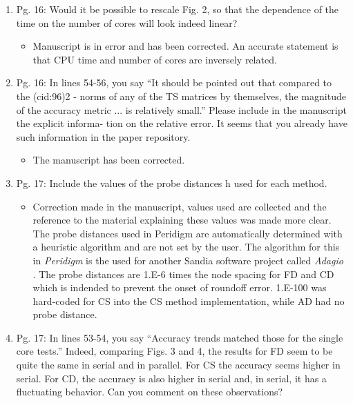 \documentclass{article}
\begin{document}
\begin{enumerate}
  \item
    Pg. 16: Would it be possible to rescale Fig. 2, so that the dependence of the time
    on the number of cores will look indeed linear?

{\color{red}  
\begin{itemize}
     \item
     Manuscript is in error and has been corrected. An accurate statement is that CPU time and number of cores are inversely related.
  \end{itemize}}

  \item
    Pg. 16: In lines 54-56, you say “It should be pointed out that compared to the (cid:96)2 -
    norms of any of the TS matrices by themselves, the magnitude of the accuracy
    metric ... is relatively small.” Please include in the manuscript the explicit informa-
    tion on the relative error. It seems that you already have such information in the
    paper repository.

{\color{red}  
\begin{itemize}
     \item
    The manuscript has been corrected. 
    \end{itemize}}

  \item
    Pg. 17: Include the values of the probe distances h used for each method.

{\color{red}  
\begin{itemize}
     \item
    Correction made in the manuscript, values used are collected and the reference to the material explaining these values was made more clear.
    The probe distances used in Peridigm are automatically determined with a
    heuristic algorithm and are not set by the user. The algorithm for this in
    \emph{Peridigm} is the used for another Sandia software project called
    \emph{Adagio} \cite{ref-Adaggio}. The probe distances are 1.E-6 times the node spacing for FD and CD which is indended to prevent the onset of roundoff error.
    1.E-100 was hard-coded for CS into the CS method implementation, while AD had no probe distance.
  \end{itemize}}

  \item
    Pg. 17: In lines 53-54, you say “Accuracy trends matched those for the single core
    tests.” Indeed, comparing Figs. 3 and 4, the results for FD seem to be quite the
    same in serial and in parallel. For CS the accuracy seems higher in serial. For CD,
    the accuracy is also higher in serial and, in serial, it has a ﬂuctuating behavior. Can
    you comment on these observations?


\end{enumerate}
\end{document}
